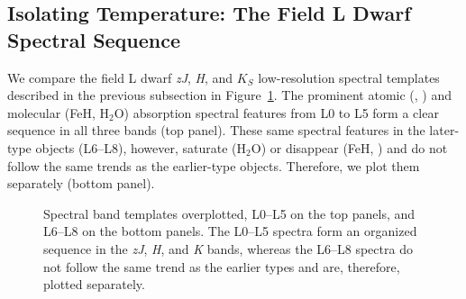 \documentclass[modern,trackchanges]{aastex61}
\begin{document}
\clearpage



\subsection{Isolating Temperature: The Field L Dwarf Spectral Sequence}
\label{sec:temp}
We compare the field L dwarf \emph{zJ}, \emph{H}, and $K_S$ low-resolution spectral templates described in the previous subsection in Figure~\ref{fig:spec_sequence}.
The prominent atomic (, ) and molecular (FeH, H$_2$O) absorption spectral features from L0 to L5 form a clear sequence in all three bands (top panel).
These same spectral features in the later-type objects (L6--L8), however, saturate (H$_2$O) or disappear (FeH, ) and do not follow the same trends as the earlier-type objects. Therefore, we plot them separately (bottom panel).



\begin{figure}
    \caption{Spectral band templates overplotted, L0--L5 on the top panels, and L6--L8 on the bottom panels.
    The L0--L5 spectra form an organized sequence in the \emph{zJ}, \emph{H}, and \emph{K} bands, whereas the L6--L8 spectra do not follow the same trend as the earlier types and are, therefore, plotted separately.}
    \label{fig:spec_sequence}
\end{figure}
\end{document}
